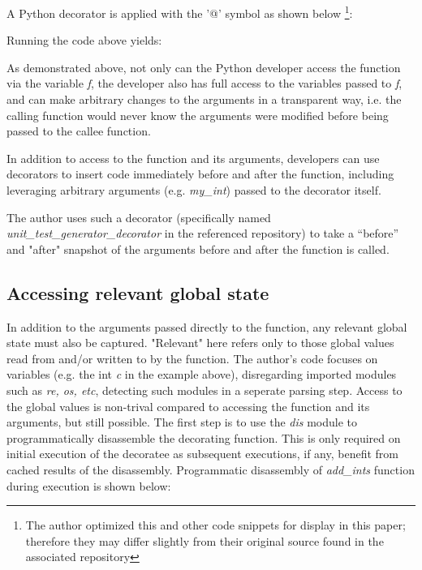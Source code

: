 A Python decorator is applied with the '@' symbol as shown below
\footnote{The author optimized this and other code snippets for display in 
this paper; therefore they may differ slightly from their original 
source found in the associated repository}:



Running the code above yields:



As demonstrated above, not only can the Python developer access the function
via the variable \textit{f}, the developer also has full
access to the variables passed to \textit{f}, and can make 
arbitrary changes to the arguments in a transparent way, 
i.e. the calling function would never know the arguments 
were modified before being passed to the callee function.

In addition to access to the function and its arguments,
developers can use decorators to insert code immediately before and after 
the function, including leveraging arbitrary arguments (e.g.
\textit{my\_int}) passed to the decorator itself.

The author uses such a decorator (specifically named 
\break
\textit{unit\_test\_generator\_decorator} in the referenced repository) to take
 a “before” and "after" snapshot of the arguments
before and after the function is called.

%
\subsection{Accessing relevant global state}\label{sec:approach-internal-2}

In addition to the arguments passed directly to the function, any relevant 
global state must also be captured. "Relevant" here refers only to those 
global values read from and/or written to by the function.
The author's code focuses on variables (e.g. the int \textit{c} in the example above), 
disregarding imported modules such as \textit{re, os, etc}, detecting such
modules in a seperate parsing step.
Access to the global values is non-trival compared to accessing the function 
and its arguments, but still possible.  The first step is to use the \textit{dis}
module to programmatically disassemble the decorating function.  This is only 
required on initial execution of the decoratee as subsequent executions, if any, 
benefit from cached results of the disassembly.
Programmatic disassembly of \textit{add\_ints} function during execution is shown below:

